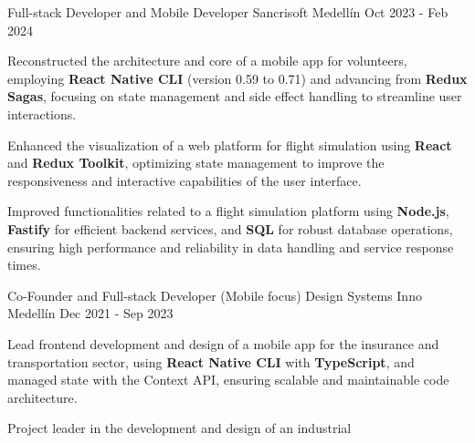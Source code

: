 \newcommand{\quotes}[1]{``#1''}

\begin{cventries}

\cventry
{Full-stack Developer and Mobile Developer} %
{Sancrisoft} %
{Medellín} %
{Oct 2023 - Feb 2024} %
{
  \begin{cvitems} %
    \item {Reconstructed the architecture and core of a mobile app for
    volunteers, employing \textbf{React Native CLI} (version 0.59 to 0.71)
    and advancing from \textbf{Redux Sagas}, focusing on state
    management and side effect handling to streamline user
    interactions.}
    \item {Enhanced the visualization of a web platform for flight
    simulation using \textbf{React} and \textbf{Redux Toolkit}, optimizing state
    management to improve the responsiveness and interactive
    capabilities of the user interface.}
    \item {Improved functionalities related to a flight simulation platform
    using \textbf{Node.js}, \textbf{Fastify} for efficient backend services, and \textbf{SQL}
    for robust database operations, ensuring high performance
    and reliability in data handling and service response times.}
  \end{cvitems}
}
\cventry
{Co-Founder and Full-stack Developer (Mobile focus)} %
{Design Systems Inno} %
{Medellín} %
{Dec 2021 - Sep 2023} %
{
  \begin{cvitems} %
    \item {Lead frontend development and design of a mobile app for
    the insurance and transportation sector, using \textbf{React Native CLI} with
    \textbf{TypeScript}, and managed state with the Context API,
    ensuring scalable and maintainable code architecture.}
    \item {Project leader in the development and design of an industrial
}
\end{cvitems}}
\end{cventries}
